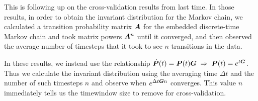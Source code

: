 This is following up on the cross-validation results from last time. In those results, in order to obtain the invariant distribution for the Markov chain, we calculated a transition probability matrix $\boldsymbol{A}$ for the embedded discrete-time Markov chain and took matrix powers $\boldsymbol{A}^n$ until it converged, and then observed the average number of timesteps that it took to see $n$ transitions in the data.

In these results, we instead use the relationship $\dot{\boldsymbol{P}} (t) = \boldsymbol{P}(t)\boldsymbol{G} \; \Rightarrow \; \boldsymbol{P}(t) = e^{t\boldsymbol{G}}$. Thus we calculate the invariant distribution using the averaging time $\Delta t$ and the number of such timesteps $n$ and observe when $e^{\Delta t\boldsymbol{G}n}$ converges. This value $n$ immediately tells us the timewindow size to remove for cross-validation.

